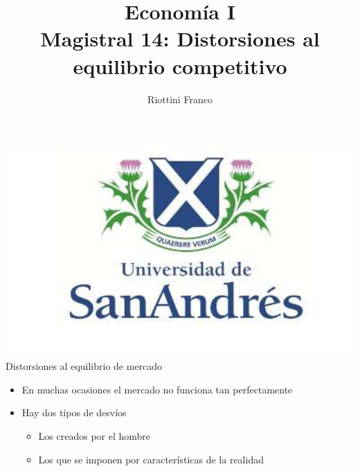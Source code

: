 \documentclass{beamer}
\title[Economía I]{Economía I \vspace{4mm}
\\ Magistral 14: Distorsiones al equilibrio competitivo}
\date{}
\author[Riottini]{Riottini Franco}
\institute[]{Universidad de San Andrés}
\begin{document}
\begin{frame}
\titlepage
\centering
\includegraphics[scale=0.2]{../Figures/logoUDESA.jpg} 
\end{frame}

\begin{frame}{Distorsiones al equilibrio de mercado}
    \begin{itemize}
        \item En muchas ocasiones el mercado no funciona tan perfectamente
        \vspace{1mm}
        \item Hay dos tipos de desvíos
        \begin{itemize}
            \item Los creados por el hombre
            \item Los que se imponen por características de la realidad
        \end{itemize}
    \end{itemize}
\end{frame}
\end{document}
